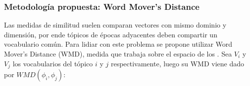 \documentclass[
	spanish, %
	aspectratio=43, %
	hyperref={pdfencoding=auto,psdextra},
	xcolor={dvipsnames,table,usenames}
]{beamer}
\begin{document}
\begin{frame}
\frametitle{Metodología propuesta: Word Mover's Distance}




Las medidas de similitud suelen comparan vectores con mismo dominio y dimensión, por ende tópicos de épocas adyacentes deben compartir un vocabulario común. Para lidiar con este problema se propone utilizar Word Mover's Distance (WMD)\cite{kusner2015word}, medida que trabaja sobre el espacio de los .
Sea  $V_{i}$ y $V_{j}$ los vocabularios del tópico $i$ y $j$ respectivamente, luego su WMD viene dado por $WMD(\phi_{i}, \phi_{j})$:


\end{frame}
\end{document}
